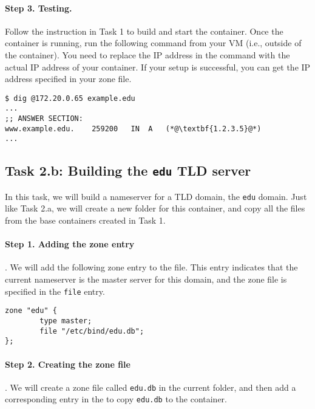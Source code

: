  


\paragraph{Step 3. Testing.} Follow the instruction in Task 1 
to build and start the container. Once the container is running,
run the following command from your VM (i.e., outside of the 
container). You need to replace the IP address in the 
command with the actual IP address of your container. If your 
setup is successful, you can get the IP address specified
in your zone file. 

\begin{lstlisting}
$ dig @172.20.0.65 example.edu
... 
;; ANSWER SECTION:
www.example.edu.    259200   IN  A   (*@\textbf{1.2.3.5}@*)
...
\end{lstlisting}




\subsection{Task 2.b: Building the \texttt{edu} TLD server}

In this task, we will build a nameserver for a TLD domain, 
the \texttt{edu} domain.
Just like Task 2.a, we will
create a new folder for this container, and copy all the 
files from the base containers created in Task 1. 

%

\paragraph{Step 1. Adding the zone entry}. We will
add the following zone entry to the
 file. This entry indicates that the current nameserver
is the master server for this domain, and the zone file is
specified in the \texttt{file} entry.


\begin{lstlisting}
zone "edu" {
        type master;
        file "/etc/bind/edu.db";
};
\end{lstlisting}


\paragraph{Step 2. Creating the zone file}. We will
create a zone file called \texttt{edu.db}
in the current folder, and then add a corresponding
entry in the \dockerfile to copy \texttt{edu.db}
to the container. 


